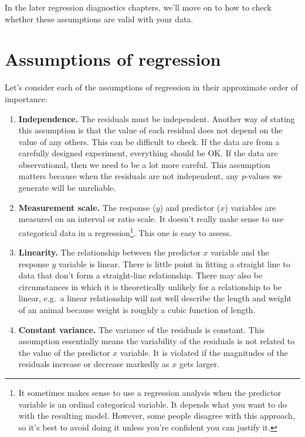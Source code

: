 \documentclass[
]{book}
\begin{document}
In the later regression diagnostics chapters, we'll move on to how to check whether these assumptions are valid with your data.

\hypertarget{assumptions-of-regression}{%
\section{Assumptions of regression}\label{assumptions-of-regression}}

Let's consider each of the assumptions of regression in their approximate order of importance:

\begin{enumerate}
\def\labelenumi{\arabic{enumi}.}
\item
  \textbf{Independence.} The residuals must be independent. Another way of stating this assumption is that the value of each residual does not depend on the value of any others. This can be difficult to check. If the data are from a carefully designed experiment, everything should be OK. If the data are observational, then we need to be a lot more careful. This assumption matters because when the residuals are not independent, any \emph{p}-values we generate will be unreliable.
\item
  \textbf{Measurement scale.} The response (\(y\)) and predictor (\(x\)) variables are measured on an interval or ratio scale. It doesn't really make sense to use categorical data in a regression\footnote{It sometimes makes sense to use a regression analysis when the predictor variable is an ordinal categorical variable. It depends what you want to do with the resulting model. However, some people disagree with this approach, so it's best to avoid doing it unless you're confident you can justify it.}. This one is easy to assess.
\item
  \textbf{Linearity.} The relationship between the predictor \(x\) variable and the response \(y\) variable is linear. There is little point in fitting a straight line to data that don't form a straight-line relationship. There may also be circumstances in which it is theoretically unlikely for a relationship to be linear, e.g.~a linear relationship will not well describe the length and weight of an animal because weight is roughly a cubic function of length.
\item
  \textbf{Constant variance.} The variance of the residuals is constant. This assumption essentially means the variability of the residuals is not related to the value of the predictor \(x\) variable. It is violated if the magnitudes of the residuals increase or decrease markedly as \(x\) gets larger.

\end{enumerate}
\end{document}
